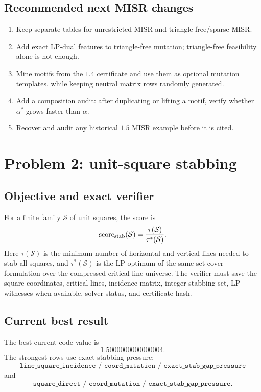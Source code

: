 \documentclass[11pt]{article}
\newcommand{\Scal}{\mathcal{S}}
\newcommand{\score}{\operatorname{score}}
\newcommand{\code}[1]{\texttt{#1}}
\begin{document}
\subsection{Recommended next MISR changes}

\begin{enumerate}
\item Keep separate tables for unrestricted MISR and triangle-free/sparse MISR.
\item Add exact LP-dual features to triangle-free mutation; triangle-free
feasibility alone is not enough.
\item Mine motifs from the $1.4$ certificate and use them as optional mutation
templates, while keeping neutral matrix rows randomly generated.
\item Add a composition audit: after duplicating or lifting a motif, verify
whether $\alpha^*$ grows faster than $\alpha$.
\item Recover and audit any historical $1.5$ MISR example before it is cited.
\end{enumerate}

\clearpage
\section{Problem 2: unit-square stabbing}

\subsection{Objective and exact verifier}

For a finite family $\Scal$ of unit squares, the score is
\[
        \score_{\rm stab}(\Scal)=
        \frac{\tau(\Scal)}{\tau^*(\Scal)}.
\]
Here $\tau(\Scal)$ is the minimum number of horizontal and vertical lines
needed to stab all squares, and $\tau^*(\Scal)$ is the LP optimum of the same
set-cover formulation over the compressed critical-line universe.  The
verifier must save the square coordinates, critical lines, incidence matrix,
integer stabbing set, LP witnesses when available, solver status, and
certificate hash.

\subsection{Current best result}

The best current-code value is
\[
        1.5000000000000004.
\]
The strongest rows use exact stabbing pressure:
\[
\code{line\_square\_incidence / coord\_mutation / exact\_stab\_gap\_pressure}
\]
and
\[
\code{square\_direct / coord\_mutation / exact\_stab\_gap\_pressure}.
\]
\end{document}
